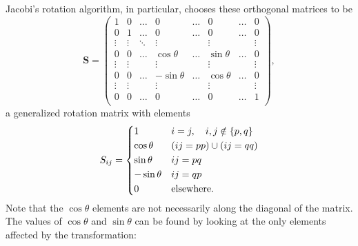 \documentclass[aps,prc,reprint]{revtex4-1}
\begin{document}
        Jacobi's rotation algorithm, in particular, chooses these orthogonal matrices to be
        \begin{equation}
            \mathbf{S} = \begin{pmatrix}
                1      & 0      & \dots  & 0           & \dots &  0         & \dots & 0\\
                0      & 1      & \dots  & 0           & \dots &  0         & \dots & 0\\
                \vdots & \vdots & \ddots & \vdots      &       & \vdots     &       & \vdots \\
                0      & 0      & \dots  & \cos\theta  & \dots & \sin\theta & \dots & 0\\
                \vdots & \vdots &        & \vdots      &       & \vdots     &       & \vdots \\
                0      & 0      & \dots  & -\sin\theta & \dots & \cos\theta & \dots & 0 \\
                \vdots & \vdots &        & \vdots      &       & \vdots     &       & \vdots \\
                0      & 0      & \dots  & 0           & \dots & 0          & \dots & 1 \\

            \end{pmatrix},
        \end{equation}
        a generalized rotation matrix with elements
        \begin{equation*}
            S_{ij} = \begin{dcases}
                1           & i=j,\quad i,j \notin \{p,q\}  \\
                \cos\theta  & (ij=pp) \cup (ij=qq) \\
                \sin\theta  & ij=pq \\
                -\sin\theta & ij=qp \\
                0           & \text{elsewhere}.
            \end{dcases}
        \end{equation*}
        Note that the $\cos\theta$ elements are not necessarily along the diagonal of the matrix. The values of $\cos\theta$ and $\sin\theta$ can be found by looking at the only elements affected by the transformation:
\end{document}
